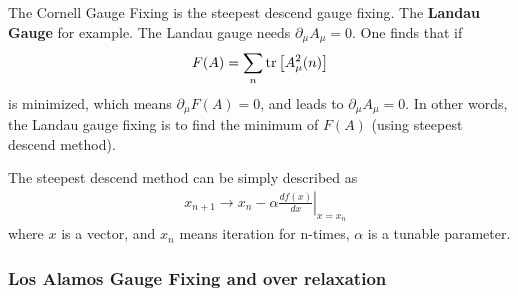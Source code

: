 The Cornell Gauge Fixing is the steepest descend gauge fixing. The \textbf{Landau Gauge} for example. The Landau gauge needs $\partial _{\mu}A_{\mu}=0$. One finds that if
\begin{equation}
\begin{split}
&F(A)=\sum _n{\rm tr}\left[A_{\mu}^2(n)\right]\\
\end{split}
\end{equation}
is minimized, which means $\partial _{\mu}F(A)=0$, and leads to $\partial _{\mu}A_{\mu}=0$. In other words, the Landau gauge fixing is to find the minimum of $F(A)$ (using steepest descend method).

The steepest descend method can be simply described as
\begin{equation}
\begin{split}
&x_{n+1}\to x_n - \alpha \left.\frac{d f(x)}{dx}\right|_{x=x_n}
\end{split}
\end{equation}
where $x$ is a vector, and $x_n$ means iteration for n-times, $\alpha$ is a tunable parameter.

\subsubsection{\label{sec:LosAlamos}Los Alamos Gauge Fixing and over relaxation} 

